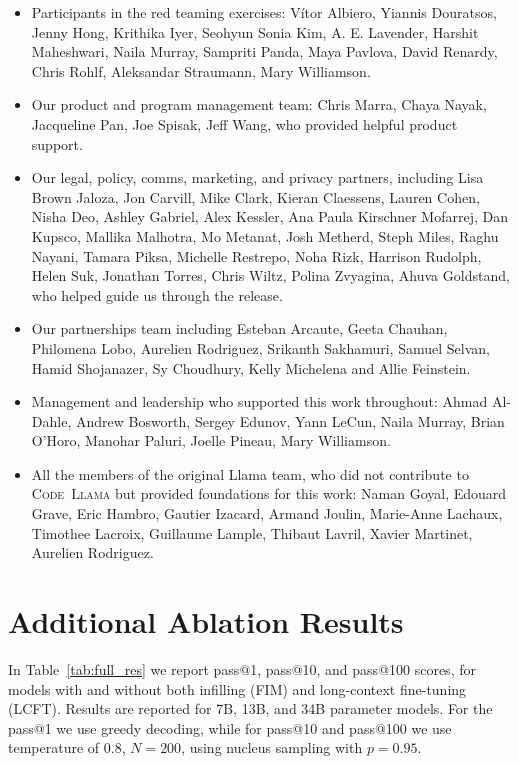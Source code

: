 \documentclass[10pt]{article}
\newcommand{\model}{\textsc{Code~Llama}\xspace}
\begin{document}
\begin{itemize}
    \item Participants in the red teaming exercises: Vítor Albiero, Yiannis Douratsos, Jenny Hong, Krithika Iyer, Seohyun Sonia Kim, A. E. Lavender, Harshit Maheshwari, Naila Murray, Sampriti Panda, Maya Pavlova, David Renardy, Chris Rohlf, Aleksandar Straumann, Mary Williamson.
    \item Our product and program management team: Chris Marra, Chaya Nayak, Jacqueline Pan, Joe Spisak, Jeff Wang, who provided helpful product support.
    \item Our legal, policy, comms, marketing, and privacy partners, including Lisa Brown Jaloza, Jon Carvill, Mike Clark, Kieran Claessens, Lauren Cohen, Nisha Deo, Ashley Gabriel, Alex Kessler, Ana Paula Kirschner Mofarrej, Dan Kupsco, Mallika Malhotra, Mo Metanat, Josh Metherd, Steph Miles, Raghu Nayani, Tamara Piksa, Michelle Restrepo, Noha Rizk, Harrison Rudolph, Helen Suk, Jonathan Torres, Chris Wiltz, Polina Zvyagina, Ahuva Goldstand, who helped guide us through the release. 
    \item Our partnerships team including Esteban Arcaute, Geeta Chauhan, Philomena Lobo, Aurelien Rodriguez, Srikanth Sakhamuri, Samuel Selvan, Hamid Shojanazer, Sy Choudhury, Kelly Michelena and Allie Feinstein.
    \item Management and leadership who supported this work throughout: Ahmad Al-Dahle, Andrew Bosworth, Sergey Edunov, Yann LeCun, Naila Murray, Brian O'Horo, Manohar Paluri, Joelle Pineau, Mary Williamson.
    \item All the members of the original Llama team, who did not contribute to \model but provided foundations for this work: Naman Goyal, Edouard Grave, Eric Hambro, Gautier Izacard, Armand Joulin, Marie-Anne Lachaux, Timothee Lacroix, Guillaume Lample, Thibaut Lavril, Xavier Martinet, Aurelien Rodriguez.
\end{itemize}

\newpage \section{Additional Ablation Results}
\label{sec:more_abb}

In Table~\ref{tab:full_res} we report pass@1, pass@10, and pass@100 scores, for models with and without both infilling (FIM) and long-context fine-tuning (LCFT). Results are reported for 7B, 13B, and 34B parameter models. For the pass@1 we use greedy decoding, while for pass@10 and pass@100 we use temperature of $0.8$, $N=200$, using nucleus sampling with $p=0.95$. 
\end{document}
